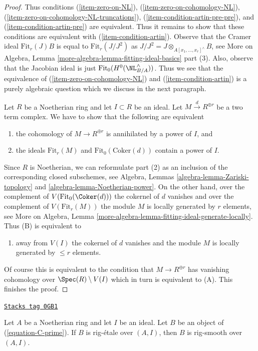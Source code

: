 \begin{proof}
\medskip\noindent
Thus conditions
(\ref{item-zero-on-NL}),
(\ref{item-zero-on-cohomology-NL}),
(\ref{item-zero-on-cohomology-NL-truncations}),
(\ref{item-condition-artin-pre-pre}), and
(\ref{item-condition-artin-pre}) are equivalent.
Thus it remains to show that these conditions are
equivalent with (\ref{item-condition-artin}).
Observe that the Cramer ideal $\text{Fit}_r(J) B$ is
equal to $\text{Fit}_r(J/J^2)$ as
$J/J^2 = J \otimes_{A[x_1, \ldots, x_r]^\wedge} B$, see
More on Algebra, Lemma \ref{more-algebra-lemma-fitting-ideal-basics} part (3).
Also, observe that the Jacobian ideal is just
$\text{Fit}_0(H^0(\NL_{B/A}^\wedge))$.
Thus we see that the equivalence of
(\ref{item-zero-on-cohomology-NL}) and (\ref{item-condition-artin})
is a purely algebraic question which we discuss in the next paragraph.

\medskip\noindent
Let $R$ be a Noetherian ring and let $I \subset R$ be an ideal.
Let $M \xrightarrow{d} R^{\oplus r}$ be a two term complex.
We have to show that the following are equivalent
\begin{enumerate}
\item[(A)] the cohomology of $M \to R^{\oplus r}$ is annihilated by a power
of $I$, and
\item[(B)] the ideals $\text{Fit}_r(M)$ and $\text{Fit}_0(\text{Coker}(d))$
contain a power of $I$.
\end{enumerate}
Since $R$ is Noetherian, we can reformulate part (2) as an inclusion
of the corresponding closed subschemes, see Algebra, Lemmas
\ref{algebra-lemma-Zariski-topology} and \ref{algebra-lemma-Noetherian-power}.
On the other hand, over the complement of $V(\text{Fit}_0(\Coker(d)))$
the cokernel of $d$ vanishes and over the complement of
$V(\text{Fit}_r(M))$ the module $M$ is locally generated by $r$
elements, see
More on Algebra, Lemma \ref{more-algebra-lemma-fitting-ideal-generate-locally}.
Thus (B) is equivalent to
\begin{enumerate}
\item[(C)] away from $V(I)$ the cokernel of $d$ vanishes and
the module $M$ is locally generated by $\leq r$ elements.
\end{enumerate}
Of course this is equivalent to the condition that $M \to R^{\oplus r}$
has vanishing cohomology over $\Spec(R) \setminus V(I)$ which in turn
is equivalent to (A). This finishes the proof.
\end{proof}

\begin{lemma}
\label{restricted-lemma-rig-etale-rig-smooth}
\href{https://stacks.math.columbia.edu/tag/0GB1}{\texttt{Stacks tag 0GB1}}

Let $A$ be a Noetherian ring and let $I$ be an ideal.
Let $B$ be an object of (\ref{equation-C-prime}).
If $B$ is rig-\'etale over $(A, I)$, then $B$ is rig-smooth over $(A, I)$.
\end{lemma}

